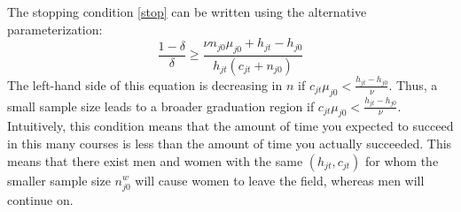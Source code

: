 \documentclass[10 pt]{article}
\begin{document}
\begin{outline}
\begin{blist}



\end{blist}



The stopping condition \eqref{stop} can be written using the alternative parameterization: 
\begin{equation*}
	\frac{1- \delta}{\delta} \geq 
	\frac{\nu n_{j0} \mu_{j0} + h_{jt} - h_{j0}}{h_{jt}(c_{jt} + n_{j0})}
\end{equation*}
The left-hand side of this equation is decreasing in $n$ if $c_{jt} \mu_{j0} < \frac{h_{jt} - h_{j0}}{\nu}$. 
Thus, a small sample size leads to a broader graduation region if $c_{jt} \mu_{j0} < \frac{h_{jt} - h_{j0}}{\nu}$.
Intuitively, this condition means that the amount of time you expected to succeed in this many courses is less than the amount of time you actually succeeded. 
This means that there exist men and women with the same $(h_{jt}, c_{jt})$ for whom the smaller sample size $n_{j0}^w$ will cause women to leave the field, whereas men will continue on. 


\end{outline}



\end{document}
